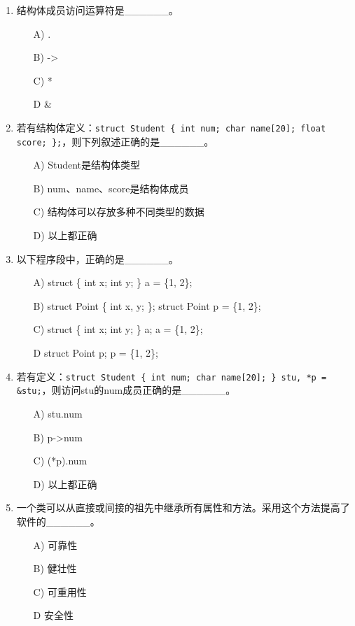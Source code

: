 \documentclass[a4paper,12pt]{article}
\begin{document}
\begin{enumerate}
	\item 结构体成员访问运算符是\_\_\_\_\_\_。
	      \begin{enumerate}
		      \item[A)] .
		      \item[B)] ->
		      \item[C)] *
		      \item[D] \&
	      \end{enumerate}
	      \vspace{0.3cm}

	\item 若有结构体定义：\texttt{struct Student \{ int num; char name[20]; float score; \};}，则下列叙述正确的是\_\_\_\_\_\_。
	      \begin{enumerate}
		      \item[A)] Student是结构体类型
		      \item[B)] num、name、score是结构体成员
		      \item[C)] 结构体可以存放多种不同类型的数据
		      \item[D)] 以上都正确
	      \end{enumerate}
	      \vspace{0.3cm}

	\item 以下程序段中，正确的是\_\_\_\_\_\_。
	      \begin{enumerate}
		      \item[A)] struct \{ int x; int y; \} a = \{1, 2\};
		      \item[B)] struct Point \{ int x, y; \}; struct Point p = \{1, 2\};
		      \item[C)] struct \{ int x; int y; \} a; a = \{1, 2\};
		      \item[D] struct Point p; p = \{1, 2\};
	      \end{enumerate}
	      \vspace{0.3cm}

	\item 若有定义：\texttt{struct Student \{ int num; char name[20]; \} stu, *p = \&stu;}，则访问stu的num成员正确的是\_\_\_\_\_\_。
	      \begin{enumerate}
		      \item[A)] stu.num
		      \item[B)] p->num
		      \item[C)] (*p).num
		      \item[D)] 以上都正确
	      \end{enumerate}
	      \vspace{0.3cm}

	\item 一个类可以从直接或间接的祖先中继承所有属性和方法。采用这个方法提高了软件的\_\_\_\_\_\_。
	      \begin{enumerate}
		      \item[A)] 可靠性
		      \item[B)] 健壮性
		      \item[C)] 可重用性
		      \item[D] 安全性
	      \end{enumerate}
	      \vspace{0.3cm}
\end{enumerate}
\end{document}
